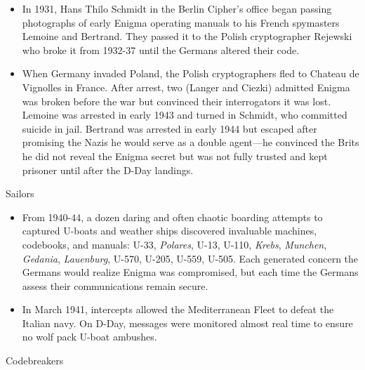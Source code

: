 \documentclass[
]{article}
\begin{document}
\begin{itemize}
\item
  In 1931, Hans Thilo Schmidt in the Berlin Cipher's office began
  passing photographs of early Enigma operating manuals to his French
  spymasters Lemoine and Bertrand. They passed it to the Polish
  cryptographer Rejewski who broke it from 1932-37 until the Germans
  altered their code.
\item
  When Germany invaded Poland, the Polish cryptographers fled to Chateau
  de Vignolles in France. After arrest, two (Langer and Ciezki) admitted
  Enigma was broken before the war but convinced their interrogators it
  was lost. Lemoine was arrested in early 1943 and turned in Schmidt,
  who committed suicide in jail. Bertrand was arrested in early 1944 but
  escaped after promising the Nazis he would serve as a double
  agent---he convinced the Brits he did not reveal the Enigma secret but
  was not fully trusted and kept prisoner until after the D-Day
  landings.
\end{itemize}

Sailors

\begin{itemize}
\item
  From 1940-44, a dozen daring and often chaotic boarding attempts to
  captured U-boats and weather ships discovered invaluable machines,
  codebooks, and manuals: U-33, \emph{Polares}, U-13, U-110,
  \emph{Krebs}, \emph{Munchen}, \emph{Gedania}, \emph{Lauenburg}, U-570,
  U-205, U-559, U-505. Each generated concern the Germans would realize
  Enigma was compromised, but each time the Germans assess their
  communications remain secure.
\item
  In March 1941, intercepts allowed the Mediterranean Fleet to defeat
  the Italian navy. On D-Day, messages were monitored almost real time
  to ensure no wolf pack U-boat ambushes.
\end{itemize}

Codebreakers
\end{document}
